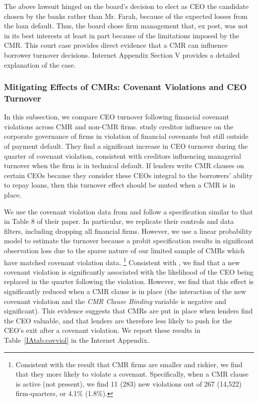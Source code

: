 \documentclass[a4paper,12pt]{article}
\begin{document}
The above lawsuit hinged on the board's decision to elect as CEO the candidate chosen by the banks rather than Mr. Farah, because of the expected losses from the loan default.
Thus, the board chose firm management that, ex post, was not in its best interests at least in part because of the limitations imposed by the CMR.
This court case provides direct evidence that a CMR can influence borrower turnover decisions.
Internet Appendix Section V provides a detailed explanation of the case.


\subsubsection{Mitigating Effects of CMRs: Covenant Violations and CEO Turnover}

In this subsection, we compare CEO turnover following financial covenant violations across CMR and non-CMR firms.
\citet{Nini_2012} study creditor influence on the corporate governance of firms in violation of financial covenants but still outside of payment default.
They find a significant increase in CEO turnover during the quarter of covenant violation, consistent with creditors influencing managerial turnover when the firm is in technical default.
If lenders write CMR clauses on certain CEOs because they consider these CEOs integral to the borrowers' ability to repay loans, then this turnover effect should be muted when a CMR is in place.


We use the covenant violation data from \citet{Nini_2012} and follow a specification similar to that in Table 8 of their paper.
In particular, we replicate their controls and data filters, including dropping all financial firms.
However, we use a linear probability model to estimate the turnover because a probit specification results in significant observation loss due to the sparse nature of our limited sample of CMRs which have matched covenant violation data.%
    \footnote{Consistent with the result that CMR firms are smaller and riskier, we find that they more likely to violate a covenant.
    Specifically, when a CMR clause is active (not present), we find 11 (283) new violations out of 267 (14,522) firm-quarters, or 4.1\% (1.8\%).}
Consistent with \citet{Nini_2012}, we find that a new covenant violation is significantly associated with the likelihood of the CEO being replaced in the quarter following the violation.
However, we find that this effect is significantly reduced when a CMR clause is in place (the interaction of the new covenant violation and the \textit{CMR Clause Binding} variable is negative and significant).
This evidence suggests that CMRs are put in place when lenders find the CEO valuable, and that lenders are therefore less likely to push for the CEO's exit after a covenant violation.
We report these results in Table~\ref{IAtab:covviol} in the Internet Appendix.
\end{document}
